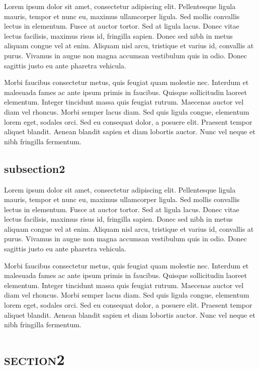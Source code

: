 \begin{multicols}{2}
\noindent  Lorem ipsum dolor sit amet, consectetur adipiscing elit. Pellentesque ligula mauris, tempor et nunc eu, maximus ullamcorper ligula. Sed mollis convallis lectus in elementum. Fusce at auctor tortor. Sed at ligula lacus. Donec vitae lectus facilisis, maximus risus id, fringilla sapien. Donec sed nibh in metus aliquam congue vel at enim. Aliquam nisl arcu, tristique et varius id, convallis at purus. Vivamus in augue non magna accumsan vestibulum quis in odio. Donec sagittis justo eu ante pharetra vehicula.

Morbi faucibus consectetur metus, quis feugiat quam molestie nec. Interdum et malesuada fames ac ante ipsum primis in faucibus. Quisque sollicitudin laoreet elementum. Integer tincidunt massa quis feugiat rutrum. Maecenas auctor vel diam vel rhoncus. Morbi semper lacus diam. Sed quis ligula congue, elementum lorem eget, sodales orci. Sed eu consequat dolor, a posuere elit. Praesent tempor aliquet blandit. Aenean blandit sapien et diam lobortis auctor. Nunc vel neque et nibh fringilla fermentum. 



\subsection{subsection2}

 Lorem ipsum dolor sit amet, consectetur adipiscing elit. Pellentesque ligula mauris, tempor et nunc eu, maximus ullamcorper ligula. Sed mollis convallis lectus in elementum. Fusce at auctor tortor. Sed at ligula lacus. Donec vitae lectus facilisis, maximus risus id, fringilla sapien. Donec sed nibh in metus aliquam congue vel at enim. Aliquam nisl arcu, tristique et varius id, convallis at purus. Vivamus in augue non magna accumsan vestibulum quis in odio. Donec sagittis justo eu ante pharetra vehicula.

Morbi faucibus consectetur metus, quis feugiat quam molestie nec. Interdum et malesuada fames ac ante ipsum primis in faucibus. Quisque sollicitudin laoreet elementum. Integer tincidunt massa quis feugiat rutrum. Maecenas auctor vel diam vel rhoncus. Morbi semper lacus diam. Sed quis ligula congue, elementum lorem eget, sodales orci. Sed eu consequat dolor, a posuere elit. Praesent tempor aliquet blandit. Aenean blandit sapien et diam lobortis auctor. Nunc vel neque et nibh fringilla fermentum. 



\section{\textsc{section2}}
\label{sec:sec02}


\end{multicols}
